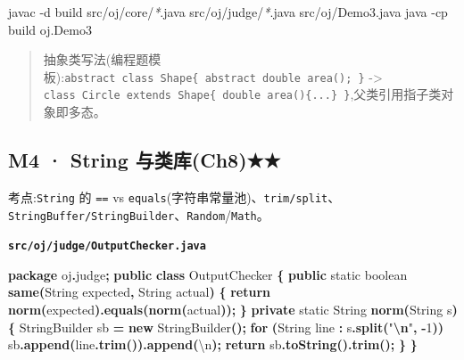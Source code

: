 \documentclass[
  11pt,
]{ctexart}
\newenvironment{Shaded}{\begin{snugshade}}{\end{snugshade}}
\newcommand{\AttributeTok}[1]{\textcolor[rgb]{0.13,0.29,0.53}{#1}}
\newcommand{\BuiltInTok}[1]{#1}
\newcommand{\CharTok}[1]{\textcolor[rgb]{0.31,0.60,0.02}{#1}}
\newcommand{\ControlFlowTok}[1]{\textcolor[rgb]{0.13,0.29,0.53}{\textbf{#1}}}
\newcommand{\DataTypeTok}[1]{\textcolor[rgb]{0.13,0.29,0.53}{#1}}
\newcommand{\DecValTok}[1]{\textcolor[rgb]{0.00,0.00,0.81}{#1}}
\newcommand{\ExtensionTok}[1]{#1}
\newcommand{\FunctionTok}[1]{\textcolor[rgb]{0.13,0.29,0.53}{\textbf{#1}}}
\newcommand{\ImportTok}[1]{#1}
\newcommand{\KeywordTok}[1]{\textcolor[rgb]{0.13,0.29,0.53}{\textbf{#1}}}
\newcommand{\NormalTok}[1]{#1}
\newcommand{\OperatorTok}[1]{\textcolor[rgb]{0.81,0.36,0.00}{\textbf{#1}}}
\newcommand{\PreprocessorTok}[1]{\textcolor[rgb]{0.56,0.35,0.01}{\textit{#1}}}
\newcommand{\SpecialCharTok}[1]{\textcolor[rgb]{0.81,0.36,0.00}{\textbf{#1}}}
\newcommand{\StringTok}[1]{\textcolor[rgb]{0.31,0.60,0.02}{#1}}
\begin{document}
\begin{Shaded}
\begin{Highlighting}[]
\ExtensionTok{javac} \AttributeTok{{-}d}\NormalTok{ build src/oj/core/}\PreprocessorTok{*}\NormalTok{.java src/oj/judge/}\PreprocessorTok{*}\NormalTok{.java src/oj/Demo3.java}
\ExtensionTok{java} \AttributeTok{{-}cp}\NormalTok{ build oj.Demo3}
\end{Highlighting}
\end{Shaded}

\begin{quote}
抽象类写法(编程题模板):\texttt{abstract\ class\ Shape\{\ abstract\ double\ area();\ \}}
-\textgreater{}
\texttt{class\ Circle\ extends\ Shape\{\ double\ area()\{...\}\ \}},父类引用指子类对象即多态。
\end{quote}

\hypertarget{m4-string-ux4e0eux7c7bux5e93ch8}{%
\subsection{M4 · String
与类库(Ch8)★★}\label{m4-string-ux4e0eux7c7bux5e93ch8}}

考点:\texttt{String} 的 \texttt{==} vs
\texttt{equals}(字符串常量池)、\texttt{trim/split}、\texttt{StringBuffer/StringBuilder}、\texttt{Random}/\texttt{Math}。

\textbf{\texttt{src/oj/judge/OutputChecker.java}}

\begin{Shaded}
\begin{Highlighting}[]
\KeywordTok{package}\ImportTok{ oj}\OperatorTok{.}\ImportTok{judge}\OperatorTok{;}
\KeywordTok{public} \KeywordTok{class}\NormalTok{ OutputChecker }\OperatorTok{\{}
    \KeywordTok{public} \DataTypeTok{static} \DataTypeTok{boolean} \FunctionTok{same}\OperatorTok{(}\BuiltInTok{String}\NormalTok{ expected}\OperatorTok{,} \BuiltInTok{String}\NormalTok{ actual}\OperatorTok{)} \OperatorTok{\{} \ControlFlowTok{return} \FunctionTok{norm}\OperatorTok{(}\NormalTok{expected}\OperatorTok{).}\FunctionTok{equals}\OperatorTok{(}\FunctionTok{norm}\OperatorTok{(}\NormalTok{actual}\OperatorTok{));} \OperatorTok{\}}
    \KeywordTok{private} \DataTypeTok{static} \BuiltInTok{String} \FunctionTok{norm}\OperatorTok{(}\BuiltInTok{String}\NormalTok{ s}\OperatorTok{)} \OperatorTok{\{}
        \BuiltInTok{StringBuilder}\NormalTok{ sb }\OperatorTok{=} \KeywordTok{new} \BuiltInTok{StringBuilder}\OperatorTok{();}
        \ControlFlowTok{for} \OperatorTok{(}\BuiltInTok{String}\NormalTok{ line }\OperatorTok{:}\NormalTok{ s}\OperatorTok{.}\FunctionTok{split}\OperatorTok{(}\StringTok{"}\SpecialCharTok{\textbackslash{}n}\StringTok{"}\OperatorTok{,} \OperatorTok{{-}}\DecValTok{1}\OperatorTok{))}\NormalTok{ sb}\OperatorTok{.}\FunctionTok{append}\OperatorTok{(}\NormalTok{line}\OperatorTok{.}\FunctionTok{trim}\OperatorTok{()).}\FunctionTok{append}\OperatorTok{(}\CharTok{\textquotesingle{}\textbackslash{}n\textquotesingle{}}\OperatorTok{);}
        \ControlFlowTok{return}\NormalTok{ sb}\OperatorTok{.}\FunctionTok{toString}\OperatorTok{().}\FunctionTok{trim}\OperatorTok{();}
    \OperatorTok{\}}
\OperatorTok{\}}
\end{Highlighting}
\end{Shaded}
\end{document}
